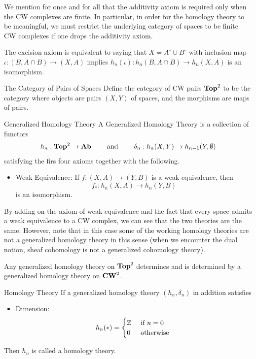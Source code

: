 \documentclass[a4paper]{article}
\begin{document}
We mention for once and for all that the additivity axiom is required only when the CW complexes are finite. In particular, in order for the homology theory to be meaningful, we must restrict the underlying category of spaces to be finite CW complexes if one drops the additivity axiom. 

\begin{lmm}{}{} The excision axiom is equivalent to saying that $X=A^\circ\cup B^\circ$ with inclusion map $\iota:(B,A\cap B)\to (X,A)$ implies $h_n(\iota):h_n(B,A\cap B)\to h_n(X,A)$ is an isomorphism. 
\end{lmm}

\begin{defn}{The Category of Pairs of Spaces}{} Define the category of CW pairs $\bold{Top}^2$ to be the category where objects are pairs $(X,Y)$ of spaces, and the morphisms are maps of pairs. 
\end{defn}

\begin{defn}{Generalized Homology Theory}{} A Generalized Homology Theory is a collection of functors $$h_n:\bold{Top}^2\to\bold{Ab}\;\;\;\;\;\;\;\text{ and }\;\;\;\;\;\;\;\delta_n:h_n(X,Y)\to h_{n-1}(Y,\emptyset)$$ satisfying the firs four axioms together with the following. 
\begin{itemize}
\item Weak Equivalence: If $f:(X,A)\to(Y,B)$ is a weak equivalence, then $$f_\ast:h_n(X,A)\to h_n(Y,B)$$ is an isomorphism. 
\end{itemize}
\end{defn}

By adding on the axiom of weak equivalence and the fact that every space admits a weak equivalence to a CW complex, we can see that the two theories are the same. However, note that in this case some of the working homology theories are not a generalized homology theory in this sense (when we encounter the dual notion, sheaf cohomology is not a generalized cohomology theory). 

\begin{thm}{}{} Any generalized homology theory on $\bold{Top}^2$ determines and is determined by a generalized homology theory on $\bold{CW}^2$.
\end{thm}

\begin{defn}{Homology Theory}{} If a generalized homology theory $(h_n,\delta_n)$ in addition satisfies 
\begin{itemize}
\item Dimension: $$h_n(\ast)=\begin{cases}
\mathbb{Z} & \text{ if } n=0\\
0 & \text{ otherwise }
\end{cases}$$
\end{itemize}
Then $h_n$ is called a homology theory. 
\end{defn}
\end{document}
